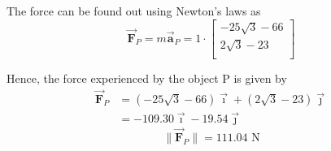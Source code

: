 The force can be found out using Newton's laws as
\begin{equation*}
    \vec{\mathbf{F}}_P
    =
    m \vec{\mathbf{a}}_P = 1 \cdot
    \begin{bmatrix}
        - 25\sqrt{3} - 66 \\
        2\sqrt{3} - 23    \\
    \end{bmatrix}
\end{equation*}

Hence, the force experienced by the object P is given by
\begin{align*}
    \vec{\mathbf{F}}_P
     & =
    \boxed{
        (- 25\sqrt{3} - 66) \vec{\mathbf{\imath}} + (2\sqrt{3} - 23) \vec{\mathbf{\jmath}}
    }
    \\ & =
    \boxed{
        -109.30 \vec{\mathbf{\imath}} -19.54 \vec{\mathbf{\jmath}}
    }
\end{align*}
\begin{equation*}
    \boxed{
        \lVert \vec{\mathbf{F}}_P \rVert = 111.04 \text{ N}
    }
\end{equation*}


